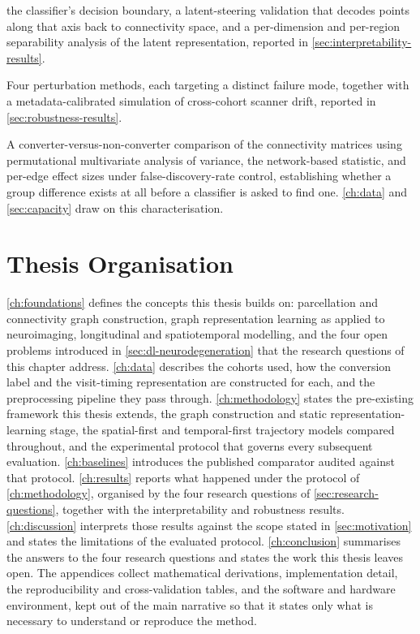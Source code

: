 \begin{description}
    the classifier's decision boundary, a latent-steering validation that decodes points
    along that axis back to connectivity space, and a per-dimension and per-region
    separability analysis of the latent representation, reported in
    \autoref{sec:interpretability-results}.
  \item[Perturbation and robustness testing.] Four perturbation methods, each targeting a
    distinct failure mode, together with a metadata-calibrated simulation of cross-cohort
    scanner drift, reported in \autoref{sec:robustness-results}.
  \item[Classical statistical characterisation before any model is fitted.] A
    converter-versus-non-converter comparison of the connectivity matrices using
    permutational multivariate analysis of variance, the network-based statistic, and
    per-edge effect sizes under false-discovery-rate control, establishing whether a group
    difference exists at all before a classifier is asked to find one.
    \autoref{ch:data} and \autoref{sec:capacity} draw on this characterisation.
\end{description}

\section{Thesis Organisation}\label{sec:organisation}

\autoref{ch:foundations} defines the concepts this thesis builds on: parcellation and
connectivity graph construction, graph representation learning as applied to
neuroimaging, longitudinal and spatiotemporal modelling, and the four open problems
introduced in \autoref{sec:dl-neurodegeneration} that the research questions of this
chapter address. \autoref{ch:data} describes the cohorts used, how the conversion label
and the visit-timing representation are constructed for each, and the preprocessing
pipeline they pass through. \autoref{ch:methodology} states the pre-existing framework
this thesis extends, the graph construction and static representation-learning stage, the
spatial-first and temporal-first trajectory models compared throughout, and the
experimental protocol that governs every subsequent evaluation. \autoref{ch:baselines}
introduces the published comparator audited against that protocol. \autoref{ch:results}
reports what happened under the protocol of \autoref{ch:methodology}, organised by the
four research questions of \autoref{sec:research-questions}, together with the
interpretability and robustness results. \autoref{ch:discussion} interprets those results
against the scope stated in \autoref{sec:motivation} and states the limitations of the
evaluated protocol. \autoref{ch:conclusion} summarises the answers to the four research
questions and states the work this thesis leaves open. The appendices collect
mathematical derivations, implementation detail, the reproducibility and cross-validation
tables, and the software and hardware environment, kept out of the main narrative so that
it states only what is necessary to understand or reproduce the method.
